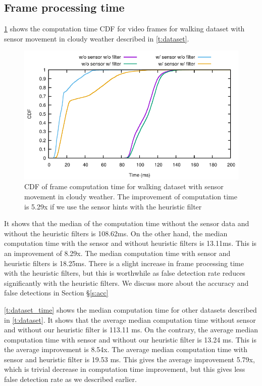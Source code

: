 \subsection{Frame processing time}
\ref{f:cdf_cloudy} shows the computation time CDF for video frames for walking dataset with sensor movement in cloudy weather described in \ref{t:dataset}.
\begin{figure}[ht]
\centering
\includegraphics[width=5.2in]{plots/cloudy_cdf.pdf}
\caption{CDF of frame computation time for walking dataset with sensor movement in cloudy weather. The improvement of computation time is 5.29x if we use the sensor hints with the heuristic filter}
\label{f:cdf_cloudy}
\end{figure}
It shows that the median of the computation time without the sensor data and without the heuristic filters is 108.62ms.
On the other hand, the median computation time with the sensor and without heuristic filters is 13.11ms.
This is an improvement of 8.29x.
The median computation time with sensor and heuristic filters is 18.25ms.
There is a slight increase in frame processing time with the heuristic filters, but this is worthwhile as false detection rate reduces significantly with the heuristic filters.  
We discuss more about the accuracy and false detections in Section \S\ref{s:acc}

\ref{t:dataset_time} shows the median computation time for other datasets described in \ref{t:dataset}.
It shows that the average median computation time without sensor and without our heuristic filter is 113.11 ms.
On the contrary, the average median computation time with sensor and without our heuristic filter is 13.24 ms.
This is the average improvement is 8.54x.
The average median computation time with sensor and heuristic filter is 19.53 ms.
This gives the average improvement 5.79x, which is trivial decrease in computation time improvement, but this gives less false detection rate as we described earlier.

